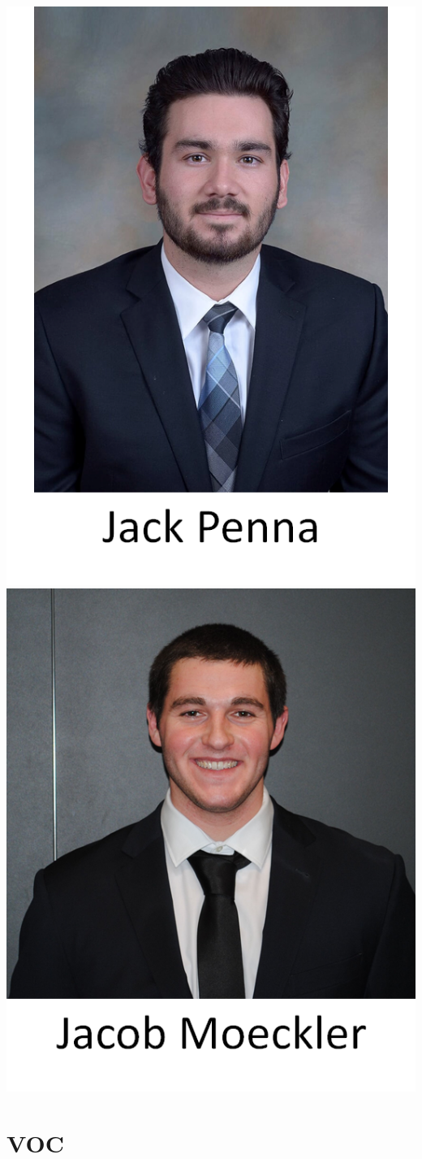 \documentclass{beamer}
\begin{document}
\begin{frame}
\includegraphics[width=.22\textwidth]{Jack_Name.png}\quad\quad
\includegraphics[width=.22\textwidth]{Jacob_Name.png} \quad\quad 


\begin{figure}

\end{figure}
\end{frame}


\section{VOC}
\end{document}
